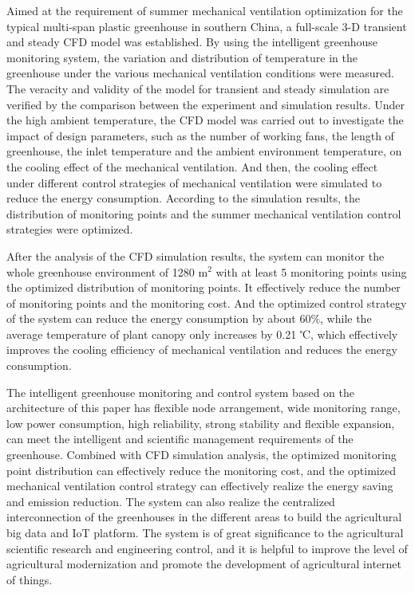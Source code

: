 \begin{englishabstract}
Aimed at the requirement of summer mechanical ventilation optimization for the typical multi-span plastic greenhouse in southern China, a full-scale 3-D transient and steady CFD model was established. By using the intelligent greenhouse monitoring system, the variation and distribution of temperature in the greenhouse under the various mechanical ventilation conditions were measured. The veracity and validity of the model for transient and steady simulation are verified by the comparison between the experiment and simulation results. Under the high ambient temperature, the CFD model was carried out to investigate the impact of design parameters, such as the number of working fans, the length of greenhouse, the inlet temperature and the ambient environment temperature, on the cooling effect of the mechanical ventilation. And then, the cooling effect under different control strategies of mechanical ventilation were simulated to reduce the energy consumption. According to the simulation results, the distribution of monitoring points and the summer mechanical ventilation control strategies were optimized.

After the analysis of the CFD simulation results, the system can monitor the whole greenhouse environment of 1280 $\text{m}^{2}$ with at least 5 monitoring points using the optimized distribution of monitoring points. It effectively reduce the number of monitoring points and the monitoring cost. And the optimized control strategy of the system can reduce the energy consumption by about 60\%, while the average temperature of plant canopy only increases by 0.21 ℃, which effectively improves the cooling efficiency of mechanical ventilation and reduces the energy consumption.

The intelligent greenhouse monitoring and control system based on the architecture of this paper has flexible node arrangement, wide monitoring range, low power consumption, high reliability, strong stability and flexible expansion, can meet the intelligent and scientific management requirements of the greenhouse. Combined with CFD simulation analysis, the optimized monitoring point distribution can effectively reduce the monitoring cost, and the optimized mechanical ventilation control strategy can effectively realize the energy saving and emission reduction. The system can also realize the centralized interconnection of the greenhouses in the different areas to build the agricultural big data and IoT platform. The system is of great significance to the agricultural scientific research and engineering control, and it is helpful to improve the level of agricultural modernization and promote the development of agricultural internet of things.

\end{englishabstract}

